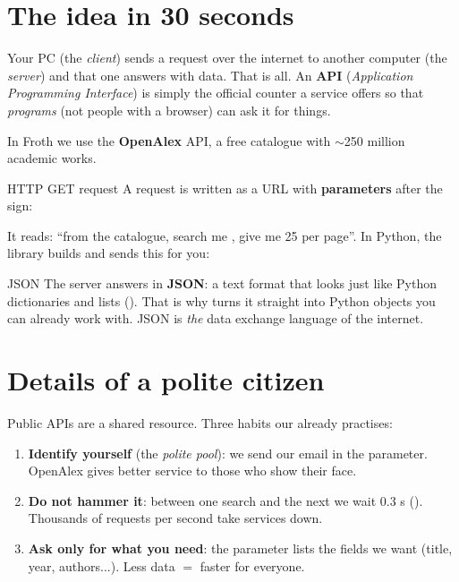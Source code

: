 \documentclass[11pt,a4paper]{article}
\begin{document}

\section{The idea in 30 seconds}

Your PC (the \emph{client}) sends a request over the internet to another computer (the
\emph{server}) and that one answers with data. That is all. An \textbf{API}
(\emph{Application Programming Interface}) is simply the official counter a service offers
so that \emph{programs} (not people with a browser) can ask it for things.

In Froth we use the \textbf{OpenAlex} API, a free catalogue with $\sim$250 million academic
works.

\begin{concepto}{HTTP GET request}
A request is written as a URL with \textbf{parameters} after the  sign:
\begin{center}
\small{}
\end{center}
It reads: ``from the  catalogue, search me , give
me 25 per page''. In Python, the  library builds and sends this for you:
\begin{center}
\end{center}
\end{concepto}

\begin{concepto}{JSON}
The server answers in \textbf{JSON}: a text format that looks just like Python dictionaries
and lists (). That is why  turns it
straight into Python objects you can already work with. JSON is \emph{the} data exchange
language of the internet.
\end{concepto}

\section{Details of a polite citizen}

Public APIs are a shared resource. Three habits our  already practises:

\begin{enumerate}
  \item \textbf{Identify yourself} (the \emph{polite pool}): we send our email in the
         parameter. OpenAlex gives better service to those who show their face.
  \item \textbf{Do not hammer it}: between one search and the next we wait 0.3 s
        (). Thousands of requests per second take services down.
  \item \textbf{Ask only for what you need}: the  parameter lists the fields we
        want (title, year, authors...). Less data $=$ faster for everyone.
\end{enumerate}
\end{document}
